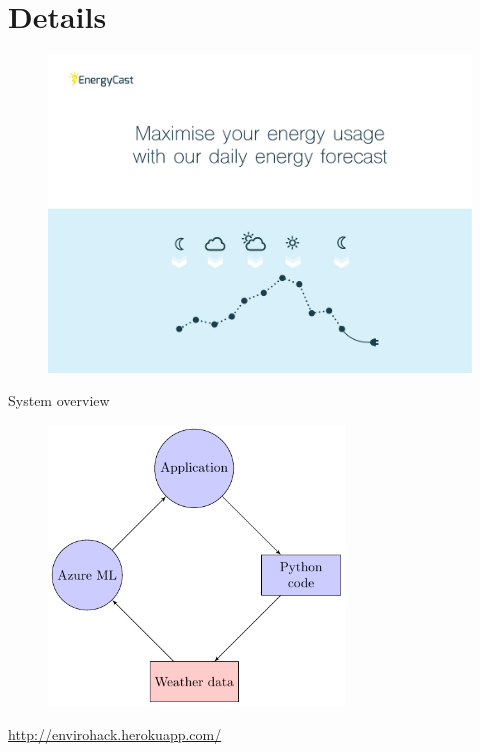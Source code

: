 \documentclass[15pt]{beamer}
\begin{document}
\section{Details}
	\begin{frame}
	\begin{figure}
		\centering
		\includegraphics[height=0.8\textheight]{pic/energycast-gaphic.pdf}
	\end{figure}	
	\end{frame}

\begin{frame}{System overview}
	
	\begin{figure} %
		\includegraphics[width=0.7\textwidth]{pic/SoftwareWorkflow.pdf}
		
	\end{figure}
	
	\url{http://envirohack.herokuapp.com/}
\end{frame}
\end{document}
